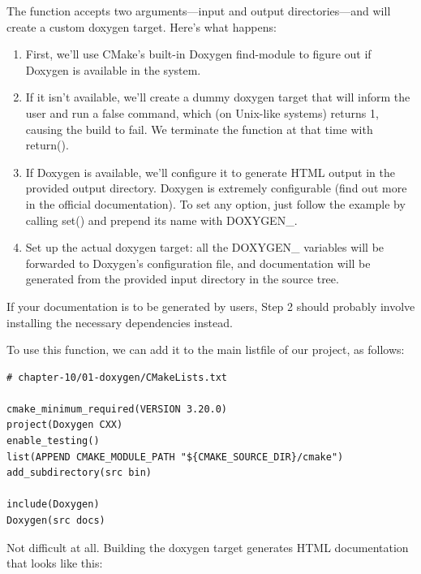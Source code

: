 The function accepts two arguments—input and output directories—and will create a custom doxygen target. Here's what happens:

\begin{enumerate}
\item 
First, we'll use CMake's built-in Doxygen find-module to figure out if Doxygen is available in the system.

\item 
If it isn't available, we'll create a dummy doxygen target that will inform the user and run a false command, which (on Unix-like systems) returns 1, causing the build to fail. We terminate the function at that time with return().

\item 
If Doxygen is available, we'll configure it to generate HTML output in the provided output directory. Doxygen is extremely configurable (find out more in the official documentation). To set any option, just follow the example by calling set() and prepend its name with DOXYGEN\_.

\item 
Set up the actual doxygen target: all the DOXYGEN\_ variables will be forwarded to Doxygen's configuration file, and documentation will be generated from the provided input directory in the source tree.
\end{enumerate}

If your documentation is to be generated by users, Step 2 should probably involve installing the necessary dependencies instead.

To use this function, we can add it to the main listfile of our project, as follows:

\begin{lstlisting}[style=styleCMake]
# chapter-10/01-doxygen/CMakeLists.txt

cmake_minimum_required(VERSION 3.20.0)
project(Doxygen CXX)
enable_testing()
list(APPEND CMAKE_MODULE_PATH "${CMAKE_SOURCE_DIR}/cmake")
add_subdirectory(src bin)

include(Doxygen)
Doxygen(src docs)
\end{lstlisting}

Not difficult at all. Building the doxygen target generates HTML documentation that looks like this:

